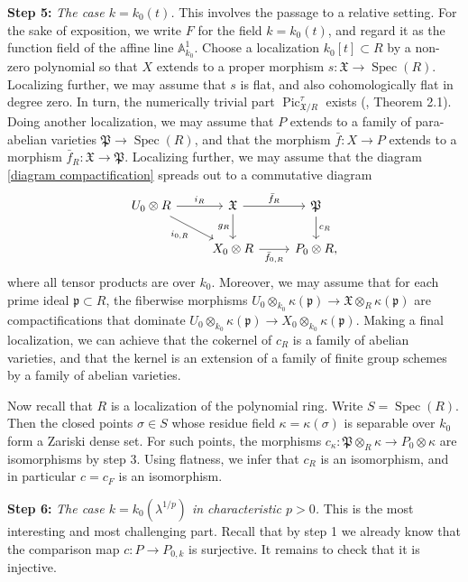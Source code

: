 \documentclass[oneside, 12pt]{amsart}
\theoremstyle{definition}
\theoremstyle{remark}
\renewcommand{\AA}{\mathbb{A}}
\newcommand{\foP}{\mathfrak{P}}
\newcommand{\foX}{\mathfrak{X}}
\newcommand{\primid}{\mathfrak{p}}
\newcommand{\Pic}{\operatorname{Pic}}
\newcommand{\ra}{\rightarrow}
\newcommand{\Spec}{\operatorname{Spec}}
\newcommand{\baf}{\bar{f}}
\begin{document}
\medskip
{\bf Step 5:}
\emph{The case $k=k_0(t)$.}
This     involves the passage to a relative setting.
For the sake of exposition, we write $F$ for the field $k=k_0(t)$, and regard it as the function field of the affine line $\AA^1_{k_0}$.
Choose a localization $k_0[t]\subset R$ by a   non-zero polynomial so that $X$
extends to a proper   morphism $s:\foX\ra\Spec(R)$. Localizing further, we may assume that $s$ is flat,
and also cohomologically flat in degree zero. In turn,   the numerically trivial part  
 $\Pic^\tau_{\foX/R}$ exists (\cite{Laurent; Schroeer 2021}, Theorem 2.1).
Doing another   localization, we may assume that $P$ extends 
to a family of para-abelian varieties $\mathfrak{P}\ra\Spec(R)$, and that the morphism $\baf:X\ra P$ extends to a morphism
$\baf_R:\foX\ra\foP$. Localizing further, we may assume that the diagram \eqref{diagram compactification} spreads out to a commutative diagram
\begin{equation}
\label{diagram 2}
\begin{tikzcd} 
U_0\otimes R\ar[r,"i_R"]\ar[rd,"i_{0,R}"']	& \foX\ar[r,"\baf_R"]\ar[d,"g_R"']		& \foP\ar[d,"c_R"]\\
			& X_0\otimes R\ar[r,"\baf_{0,R}"']	& P_0\otimes R,
\end{tikzcd}
\end{equation}
where all tensor products are over $k_0$. 
Moreover, we may assume that for each prime ideal $\primid\subset R$, the fiberwise morphisms  $U_0\otimes_{k_0}\kappa(\primid)\ra\foX\otimes_R\kappa(\primid)$
are compactifications that dominate $U_0\otimes_{k_0}\kappa(\primid)\ra X_0\otimes_{k_0}\kappa(\primid)$.
Making a final localization, we can achieve that the cokernel of $c_R$ is a family of abelian varieties,
and that the kernel is an extension of a family of finite group schemes by a family of abelian varieties.

Now recall that $R$ is a localization of the polynomial ring. Write $S=\Spec(R)$.
Then the closed points $\sigma\in S$ whose residue field $\kappa=\kappa(\sigma)$ is separable over $k_0$ form
a Zariski dense set. For such points, the morphisms $c_\kappa:\foP\otimes_R\kappa\ra P_0\otimes \kappa$ are isomorphisms by step 3.
Using flatness, we infer that $c_R$ is an isomorphism, and in particular $c=c_F$ is an isomorphism.


\medskip
{\bf Step 6:}
\emph{The case $k=k_0(\lambda^{1/p})$ in characteristic $p>0$.}
This is the most interesting and most challenging part.  Recall that by step 1 we already know that   
the comparison map $c:P\ra P_{0,k}$ is surjective. 
It remains to check that it is   injective.
\end{document}
